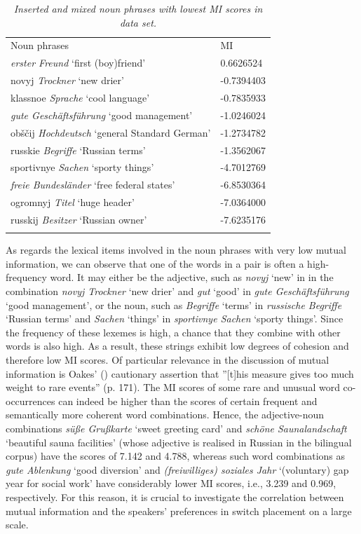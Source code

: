\begin{table}
		{\begin{tabularx}{\textwidth}{XR{1.75cm}} 
		    \midrule
			\addlinespace[2mm]
			Noun phrases	& MI \\ \addlinespace[2mm] \midrule
			\addlinespace[2mm]
			\textit{erster Freund}	`first (boy)friend' &0.6626524\\
			novyj \textit{Trockner} `new drier'		&-0.7394403\\
			klassnoe \textit{Sprache} `cool language' 	&-0.7835933\\
			\textit{gute Geschäftsführung} `good management'	&-1.0246024\\
			obščij \textit{Hochdeutsch}	 `general Standard German'	&-1.2734782\\
			russkie \textit{Begriffe} `Russian terms'	&-1.3562067\\
			sportivnye \textit{Sachen} `sporty things'	&-4.7012769\\
			\textit{freie Bundesländer} `free federal states' &-6.8530364\\
			ogromnyj \textit{Titel}	 `huge header'	&-7.0364000\\
			russkij \textit{Besitzer} `Russian owner'	&-7.6235176\\
\addlinespace[2mm]
			\midrule 
		\end{tabularx}}
\caption{\textit{Inserted and mixed noun phrases with lowest MI scores in data set.}} \label{tab:4:10} 
\end{table}

As regards the lexical items involved in the noun phrases with very low mutual information, we can observe that one of the words in a pair is often a high-frequency word. It may either be the adjective, such as \textit{novyj} `new' in in the combination \textit{novyj Trockner} `new drier' and \textit{gut} `good' in \textit{gute Geschäftsführung} `good management', or the noun, such as \textit{Begriffe} `terms' in \textit{russische Begriffe} `Russian terms' and \textit{Sachen} `things' in \textit{sportivnye Sachen} `sporty things'. Since the frequency of these lexemes is high, a chance that they combine with other words is also high. As a result, these strings exhibit low degrees of cohesion and therefore low MI scores. Of particular relevance in the discussion of mutual information is Oakes' (\citeyear{oakes-1998}) cautionary assertion that ''[t]his measure gives too much weight to rare events'' (p. 171). The MI scores of some rare and unusual word co-occurrences can indeed be higher than the scores of certain frequent and semantically more coherent word combinations. Hence, the adjective-noun combinations \textit{süße Grußkarte} `sweet greeting card' and \textit{schöne Saunalandschaft} `beautiful sauna facilities' (whose adjective is realised in Russian in the bilingual corpus) have the scores of 7.142 and 4.788, whereas such word combinations as \textit{gute Ablenkung} `good diversion' and \textit{(freiwilliges) soziales Jahr} `(voluntary) gap year for social work' have considerably lower MI scores, i.e., 3.239 and 0.969, respectively. For this reason, it is crucial to investigate the correlation between mutual information and the speakers' preferences in switch placement on a large scale.

